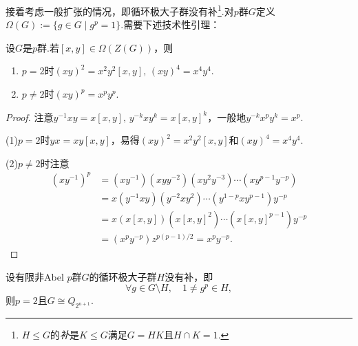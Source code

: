 接着考虑一般扩张的情况，即循环极大子群没有{\heiti 补}\footnote{$H\le G$的\emph{补}是$K\le G$满足$G=HK$且$H\cap K=1$.}.对$p$群$G$定义$\Omega(G):=\{g\in G\mid g^p=1\}$.需要下述技术性引理：
\begin{lemma}
	设$G$是$p$群.若$[x,y]\in\Omega(Z(G))$，则
	\begin{enumerate}
		\item $p=2$时$(xy)^2=x^2y^2[x,y],\,(xy)^4=x^4y^4$.
		\item $p\ne 2$时$(xy)^p=x^py^p$.
	\end{enumerate}
\end{lemma}
\begin{proof}
	注意$y^{-1}xy=x[x,y],\,y^{-k}xy^k=x[x,y]^k$，一般地$y^{-k}x^py^k=x^p$.

	(1)$p=2$时$yx=xy[x,y]$，易得$(xy)^2=x^2y^2[x,y]$和$(xy)^4=x^4y^4$.

	(2)$p\ne 2$时注意
	\begin{align*}
		(xy^{-1})^p&=(xy^{-1})(xyy^{-2})(xy^2y^{-3})\cdots(xy^{p-1}y^{-p})\\
		&=x(y^{-1}xy)(y^{-2}xy^2)\cdots(y^{1-p}xy^{p-1})y^{-p}\\
		&=x(x[x,y])(x[x,y]^2)\cdots(x[x,y]^{p-1})y^{-p}\\
		&=(x^py^{-p})z^{p(p-1)/2}=x^py^{-p}.
	\end{align*}
\end{proof}
\begin{prop}
	设有限非Abel $p$群$G$的循环极大子群$H$没有补，即
	\[
		\forall g\in G\setminus H,\quad 1\ne g^p\in H,
	\]
	则$p=2$且$G\cong Q_{2^{n+1}}$.\hypertarget{prop:pGroupCyclicMax2}{}
\end{prop}
